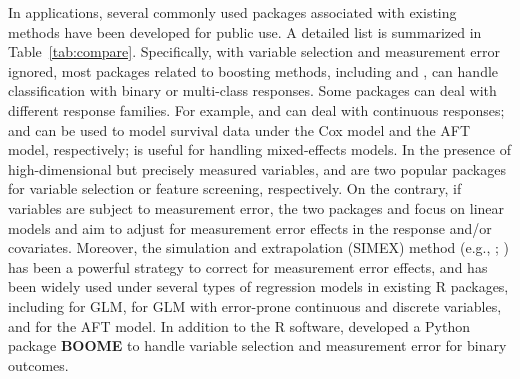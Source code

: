 In applications, several commonly used packages associated with existing methods have been developed for public use. A detailed list is summarized in Table~\ref{tab:compare}. Specifically, with variable selection and measurement error ignored,  most packages related to boosting methods, including  and , can handle classification with binary or multi-class responses. {Some packages can deal with different response families.} For example,  and  can deal with continuous responses;  and  {can be used to} model survival data under the Cox model and the AFT model, respectively;  is useful for handling mixed-effects models. In the presence of high-dimensional but precisely measured variables,   and  are two popular packages {for} variable selection or feature screening, respectively. On the contrary, if variables are subject to measurement error, the two packages  and  focus on linear models and aim to adjust for measurement error effects in the response and/or covariates. Moreover, the simulation and extrapolation (SIMEX) method (e.g., \citealp{ChenYi:2021}; \citealp{Carroll:2006}) has been a powerful strategy to correct for measurement error effects, and has been widely used under several types of regression models in existing R packages, including  for GLM,   for GLM with error-prone continuous and discrete variables, and  for the AFT model. In addition to the R software, \cite{BOOME} developed a Python package {\bf BOOME} to handle variable selection and measurement error for binary outcomes. 
 
